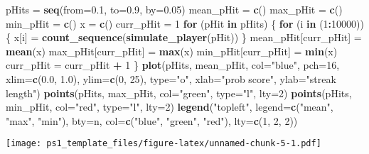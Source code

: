 \documentclass[
]{article}
\newenvironment{Shaded}{\begin{snugshade}}{\end{snugshade}}
\newcommand{\AttributeTok}[1]{\textcolor[rgb]{0.13,0.29,0.53}{#1}}
\newcommand{\ControlFlowTok}[1]{\textcolor[rgb]{0.13,0.29,0.53}{\textbf{#1}}}
\newcommand{\DecValTok}[1]{\textcolor[rgb]{0.00,0.00,0.81}{#1}}
\newcommand{\FloatTok}[1]{\textcolor[rgb]{0.00,0.00,0.81}{#1}}
\newcommand{\FunctionTok}[1]{\textcolor[rgb]{0.13,0.29,0.53}{\textbf{#1}}}
\newcommand{\NormalTok}[1]{#1}
\newcommand{\OtherTok}[1]{\textcolor[rgb]{0.56,0.35,0.01}{#1}}
\newcommand{\SpecialCharTok}[1]{\textcolor[rgb]{0.81,0.36,0.00}{\textbf{#1}}}
\newcommand{\StringTok}[1]{\textcolor[rgb]{0.31,0.60,0.02}{#1}}
\begin{document}
\begin{Shaded}
\begin{Highlighting}[]
\NormalTok{pHits }\OtherTok{=} \FunctionTok{seq}\NormalTok{(}\AttributeTok{from=}\FloatTok{0.1}\NormalTok{, }\AttributeTok{to=}\FloatTok{0.9}\NormalTok{, }\AttributeTok{by=}\FloatTok{0.05}\NormalTok{)}
\NormalTok{mean\_pHit }\OtherTok{=} \FunctionTok{c}\NormalTok{()}
\NormalTok{max\_pHit }\OtherTok{=} \FunctionTok{c}\NormalTok{()}
\NormalTok{min\_pHit }\OtherTok{=} \FunctionTok{c}\NormalTok{()}
\NormalTok{x }\OtherTok{=} \FunctionTok{c}\NormalTok{()}
\NormalTok{curr\_pHit }\OtherTok{=} \DecValTok{1}
\ControlFlowTok{for}\NormalTok{ (pHit }\ControlFlowTok{in}\NormalTok{ pHits) \{}
  \ControlFlowTok{for}\NormalTok{ (i }\ControlFlowTok{in}\NormalTok{ (}\DecValTok{1}\SpecialCharTok{:}\DecValTok{10000}\NormalTok{)) \{}
\NormalTok{    x[i] }\OtherTok{=} \FunctionTok{count\_sequence}\NormalTok{(}\FunctionTok{simulate\_player}\NormalTok{(pHit))}
\NormalTok{  \}}
\NormalTok{  mean\_pHit[curr\_pHit] }\OtherTok{=} \FunctionTok{mean}\NormalTok{(x)}
\NormalTok{  max\_pHit[curr\_pHit] }\OtherTok{=} \FunctionTok{max}\NormalTok{(x)}
\NormalTok{  min\_pHit[curr\_pHit] }\OtherTok{=} \FunctionTok{min}\NormalTok{(x)}
\NormalTok{  curr\_pHit }\OtherTok{=}\NormalTok{ curr\_pHit }\SpecialCharTok{+} \DecValTok{1}
\NormalTok{\}}
\FunctionTok{plot}\NormalTok{(pHits, mean\_pHit, }\AttributeTok{col=}\StringTok{"blue"}\NormalTok{, }\AttributeTok{pch=}\DecValTok{16}\NormalTok{, }\AttributeTok{xlim=}\FunctionTok{c}\NormalTok{(}\FloatTok{0.0}\NormalTok{, }\FloatTok{1.0}\NormalTok{), }\AttributeTok{ylim=}\FunctionTok{c}\NormalTok{(}\DecValTok{0}\NormalTok{, }\DecValTok{25}\NormalTok{),}
     \AttributeTok{type=}\StringTok{"o"}\NormalTok{, }\AttributeTok{xlab=}\StringTok{"prob score"}\NormalTok{, }\AttributeTok{ylab=}\StringTok{"streak length"}\NormalTok{)}
\FunctionTok{points}\NormalTok{(pHits, max\_pHit, }\AttributeTok{col=}\StringTok{"green"}\NormalTok{, }\AttributeTok{type=}\StringTok{"l"}\NormalTok{, }\AttributeTok{lty=}\DecValTok{2}\NormalTok{)}
\FunctionTok{points}\NormalTok{(pHits, min\_pHit, }\AttributeTok{col=}\StringTok{"red"}\NormalTok{, }\AttributeTok{type=}\StringTok{"l"}\NormalTok{, }\AttributeTok{lty=}\DecValTok{2}\NormalTok{)}
\FunctionTok{legend}\NormalTok{(}\StringTok{"topleft"}\NormalTok{, }\AttributeTok{legend=}\FunctionTok{c}\NormalTok{(}\StringTok{"mean"}\NormalTok{, }\StringTok{"max"}\NormalTok{, }\StringTok{"min"}\NormalTok{), }\AttributeTok{bty=}\StringTok{\textquotesingle{}n\textquotesingle{}}\NormalTok{, }\AttributeTok{col=}\FunctionTok{c}\NormalTok{(}\StringTok{"blue"}\NormalTok{, }\StringTok{"green"}\NormalTok{, }\StringTok{"red"}\NormalTok{),}
       \AttributeTok{lty=}\FunctionTok{c}\NormalTok{(}\DecValTok{1}\NormalTok{, }\DecValTok{2}\NormalTok{, }\DecValTok{2}\NormalTok{))}
\end{Highlighting}
\end{Shaded}

\texttt{[image: ps1\_template\_files/figure-latex/unnamed-chunk-5-1.pdf]}
\end{document}
